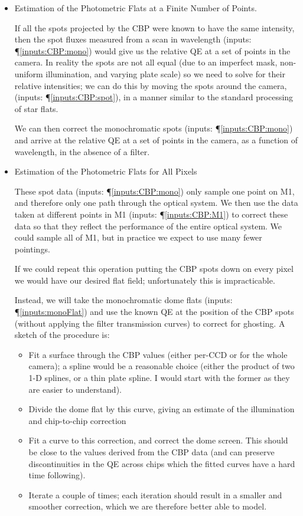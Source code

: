 \documentclass[12pt]{article}
\newcommand{\inputData}[1]{(inputs: \P \ref{inputs:#1})}
\begin{document}
\begin{itemize}
\item Estimation of the Photometric Flats at a Finite Number of Points.

  If all the spots projected by the CBP were known to have the same intensity, then the spot fluxes measured
  from a scan in wavelength \inputData{CBP:mono} would give us the relative QE at a set of points in the
  camera.  In reality the spots are not all equal (due to an imperfect mask, non-uniform illumination, and
  varying plate scale) so we need to solve for their relative intensities; we can do this by moving the spots
  around the camera, \inputData{CBP:spot}, in a manner similar to the standard processing of star flats.

  We can then correct the monochromatic spots \inputData{CBP:mono} and arrive at the relative QE at a set of
  points in the camera, as a function of wavelength, in the absence of a filter.

\item Estimation of the Photometric Flats for All Pixels

  These spot data \inputData{CBP:mono} only sample one point on M1, and therefore only one path
  through the optical system.  We then use the data taken at different points in M1 \inputData{CBP:M1}
  to correct these data so that they reflect the performance of the entire optical system.  We
  could sample all of M1, but in practice we expect to use many fewer pointings.

  If we could repeat this operation putting the CBP spots down on every pixel we would have our
  desired flat field;  unfortunately this is impracticable.

  Instead, we will take the monochromatic dome flats \inputData{monoFlat} and use the known QE at the position
  of the CBP spots (without applying the filter transmission curves) to correct for ghosting.  A sketch
  of the procedure is:
  \begin{itemize}
  \item Fit a surface through the CBP values (either per-CCD or for the whole camera); a spline would
    be a reasonable choice (either the product of two 1-D splines, or a thin plate spline.  I would
    start with the former as they are easier to understand).
  \item Divide the dome flat by this curve, giving an estimate of the illumination and chip-to-chip
    correction
  \item Fit a curve to this correction, and correct the dome screen.  This should be close to the
    values derived from the CBP data (and can preserve discontinuities in the QE across chips which
    the fitted curves have a hard time following).
  \item Iterate a couple of times;  each iteration should result in a smaller and smoother correction,
    which we are therefore better able to model.
  \end{itemize}


\end{itemize}
\end{document}
